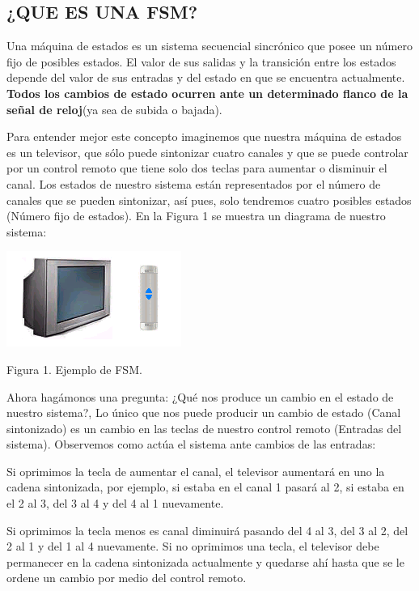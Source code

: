 \subsection[¿QUE ES UNA FSM?]{ ¿QUE ES UNA FSM?}
Una máquina de estados es un sistema secuencial sincrónico que posee un número fijo de posibles estados. El valor de sus salidas y la transición entre los estados depende del valor de sus entradas y del estado en que se encuentra actualmente. \textbf{Todos los cambios de estado ocurren ante un determinado flanco de la señal de reloj}(ya sea de subida o bajada).

Para entender mejor este concepto imaginemos que nuestra máquina de estados es un televisor, que sólo puede sintonizar cuatro canales y que se puede controlar por un control remoto que tiene solo dos teclas para aumentar o disminuir el canal. Los estados de nuestro sistema están representados por el número de canales que se pueden sintonizar, así pues, solo tendremos cuatro posibles estados (Número fijo de estados).  En la Figura 1 se muestra un diagrama de nuestro sistema:

{\centering 
\includegraphics[width=5.715cm,height=3.122cm]{./images/FSM-img1.png} \par}

{\centering
Figura 1. Ejemplo de FSM.
\par}

Ahora hagámonos una pregunta: ¿Qué nos produce un cambio en el estado de nuestro sistema?, Lo único que nos puede producir un cambio de estado
(Canal sintonizado) es un cambio en las teclas de nuestro control remoto (Entradas del sistema). Observemos como actúa el sistema ante cambios de las entradas:

Si oprimimos la tecla de aumentar el canal, el televisor aumentará en uno la cadena sintonizada, por ejemplo, si estaba en el canal 1 pasará
al 2, si estaba en el 2 al 3, del 3 al 4 y del 4 al 1 nuevamente.

Si oprimimos la tecla menos es canal diminuirá pasando del 4 al 3, del 3 al 2, del 2 al 1 y del 1 al 4 nuevamente.
Si no oprimimos una tecla, el televisor debe permanecer en la cadena sintonizada actualmente y quedarse ahí hasta que se le ordene un cambio
por medio del control remoto.

